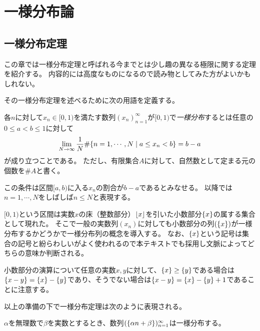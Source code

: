 
\chapter{一様分布論}

\section{一様分布定理}

この章では一様分布定理と呼ばれる今までとは少し趣の異なる極限に関する定理を紹介する。
内容的には高度なものになるので読み物としてみた方がよいかもしれない。

その一様分布定理を述べるために次の用語を定義する。

\begin{definition}[一様分布列]
各$n$に対して$x_n \in [0, 1)$を満たす数列$(x_n)_{n = 1}^\infty$が$[0, 1)$で\emph{一様分布}するとは任意の$0 \le a < b \le 1$に対して
\begin{equation}
\label{e_unifdist}
\lim_{N \to \infty}\frac{1}{N}\#\{ n = 1, \cdots, N \mid a \le x_n < b \} = b-a
\end{equation}
が成り立つことである。
ただし、有限集合$A$に対して、自然数として定まる元の個数を$\# A$と書く。
\end{definition}

この条件は区間$[a, b)$に入る$x_n$の割合が$b-a$であるとみなせる。
以降では$n = 1, \cdots, N$をしばしば$n \le N$と表現する。

$[0, 1)$という区間は実数$x$の床（整数部分）$\lfloor x\rfloor$を引いた小数部分$\{x\}$の属する集合として現れた。
そこで一般の実数列$(x_n)$に対しても小数部分の列$(\{x\})$が一様分布するかどうかで一様分布列の概念を導入する。
なお、$\{x\}$という記号は集合の記号と紛らわしいがよく使われるので本テキストでも採用し文脈によってどちらの意味か判断される。

\begin{remark}
小数部分の演算について任意の実数$x, y$に対して、$\{x\} \ge \{y\}$である場合は$\{x-y\} = \{x\}-\{y\}$であり、そうでない場合は$\{x-y\} = \{x\}-\{y\}+1$であることに注意する。
\end{remark}

以上の準備の下で一様分布定理は次のように表現される。

\begin{theorem}[一様分布定理]
$\alpha$を無理数で$\beta$を実数とするとき、数列$(\{\alpha n+\beta\})_{n = 1}^\infty$は一様分布する。
\end{theorem}


